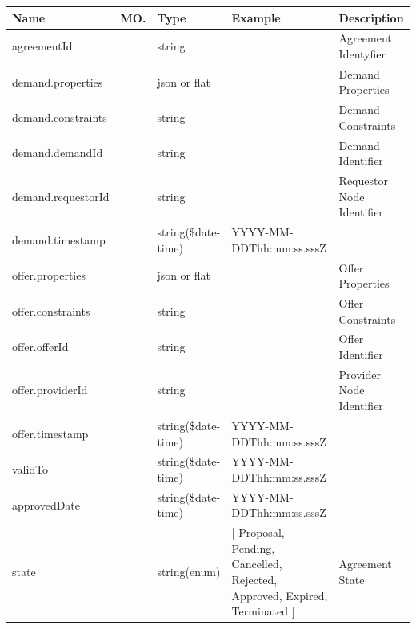 \begin{enumerate}
\begin{tcolorbox}[boxrule=0pt, frame empty]
\begin{verbatim}
\end{verbatim}
\end{tcolorbox}

\begin{table}[H]
\footnotesize

\begin{center}
\begin{tabular}{|p{3cm}|l|p{3cm}|p{3cm}|p{4cm}|} 
\hline
\rowcolor{lightgray}	Name	& MO.	& Type	& Example & 	Description \\
\hline

agreementId				& 	& 	string				&		&	Agreement Identyfier \\ 
\hline

demand.properties		&	&	json or flat		&		& 	Demand Properties \\
\hline

demand.constraints		&	&	string				&		&	Demand Constraints \\	
\hline

demand.demandId			&	&	string				&		&	Demand Identifier \\
\hline 		

demand.requestorId		&	&	string 				&		&	Requestor Node Identifier \\
\hline

demand.timestamp		& 	& 	string(\$date-time)	&	YYYY-MM-DDThh:mm:ss.sssZ	&	 \\ 
\hline

offer.properties		&	&	json or flat		&		& 	Offer Properties \\
\hline

offer.constraints		&	&	string				&		&	Offer Constraints \\	
\hline

offer.offerId			&	&	string				&		&	Offer Identifier \\
\hline 		

offer.providerId		&	&	string 				&		&	Provider Node Identifier \\
\hline

offer.timestamp		& 	& 	string(\$date-time)	&	YYYY-MM-DDThh:mm:ss.sssZ	&	 \\ 
\hline

validTo			& 	& 	string(\$date-time)	&	YYYY-MM-DDThh:mm:ss.sssZ	&	 \\ 
\hline

approvedDate	& 	& 	string(\$date-time)	&	YYYY-MM-DDThh:mm:ss.sssZ	&	 \\ 
\hline

state			& 	& 	string(enum)		&	[ Proposal, Pending, Cancelled, Rejected, Approved, Expired, Terminated ]	& Agreement State	\\ 
\hline


\end{tabular}
\end{center}
\end{table}
\end{enumerate}
